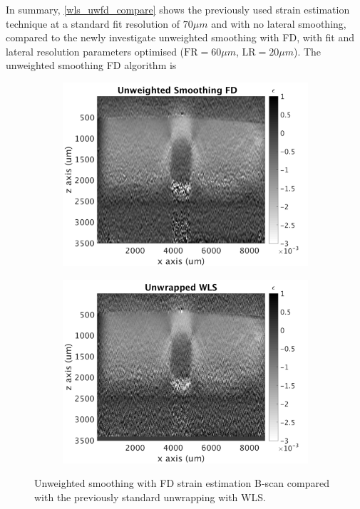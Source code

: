 In summary, \autoref{wls_uwfd_compare} shows the previously used strain estimation technique at a standard fit resolution of $70\mu m$ and with no lateral smoothing, compared to the newly investigate unweighted smoothing with FD, with fit and lateral resolution parameters optimised ($\text{FR}=60\mu m$, $\text{LR}= 20\mu m$). The unweighted smoothing FD algorithm is  

\begin{figure}
	\centering
	\begin{subfigure}{0.49\textwidth}
		\centering
		\includegraphics[width=\textwidth]{figures/uwfd_compare.png}
	\end{subfigure}
	\begin{subfigure}{0.49\textwidth}
		\centering
		\includegraphics[width=\textwidth]{figures/wls_compare.png}
	\end{subfigure}
	\caption{Unweighted smoothing with FD strain estimation B-scan compared with the previously standard unwrapping with WLS.}
	\label{wls_uwfd_compare}
\end{figure}

